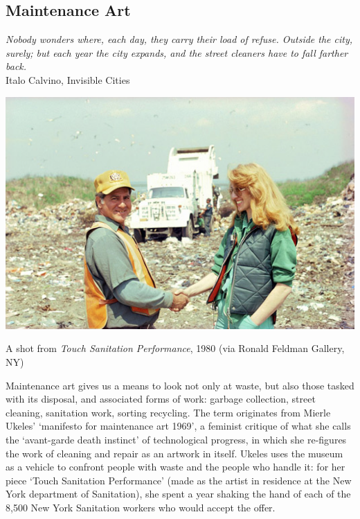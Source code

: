 \documentclass[nofonts,nols,justified,nobib]{tufte-book}
\begin{document}
\subsection*{Maintenance Art}

\begin{flushright}
\emph{Nobody wonders where, each day, they carry their load of refuse. Outside the city, surely; but each year the city expands, and the street cleaners have to fall farther back.}\cite{calvino_invisible_1974}\\
Italo Calvino, Invisible Cities
\end{flushright}


\begin{marginfigure}
\includegraphics[width=\textwidth]{img/1/touch-sanitation.png}
\caption{A shot from \emph{Touch Sanitation Performance}, 1980 (via Ronald Feldman Gallery, NY) \label{b}}
\end{marginfigure}


Maintenance art gives us a means to look not only at waste, but also those tasked with its disposal, and associated forms of work: garbage collection, street cleaning, sanitation work, sorting recycling. The term originates from Mierle Ukeles'  `manifesto for maintenance art 1969'\cite{ukeles_manifesto_1969}, a feminist critique of what she calls the `avant-garde death instinct' of technological progress, in which she re-figures the work of cleaning and repair as an artwork in itself. Ukeles uses the museum as a vehicle to confront people with waste and the people who handle it: for her piece `Touch Sanitation Performance' (made as the artist in residence at the New York department of Sanitation), she spent a year shaking the hand of each of the 8,500 New York Sanitation workers who would accept the offer.\cite{ukeles_touch_1980}
\end{document}
